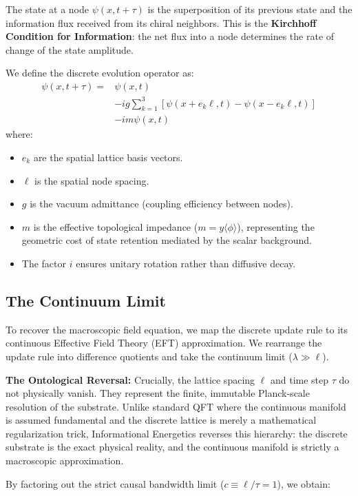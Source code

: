 The state at a node $\psi(x, t+\tau)$ is the superposition of its previous state and the information flux received from its chiral neighbors. This is the \textbf{Kirchhoff Condition for Information}: the net flux into a node determines the rate of change of the state amplitude.

We define the discrete evolution operator as:
\begin{align}
    \psi(x, t + \tau) = &\psi(x, t) \nonumber \\
    &- ig \sum_{k=1}^3[\psi(x + e_k \ell, t) - \psi(x - e_k \ell, t)] \nonumber \\
    &- im\psi(x, t)
\label{eq:unitary_flux}
\end{align}
where:
\begin{itemize}
    \item $e_k$ are the spatial lattice basis vectors.
    \item $\ell$ is the spatial node spacing.
    \item $g$ is the vacuum admittance (coupling efficiency between nodes).
    \item $m$ is the effective topological impedance ($m = y\langle\phi\rangle$), representing the geometric cost of state retention mediated by the scalar background.
    \item The factor $i$ ensures unitary rotation rather than diffusive decay.
\end{itemize}

\subsection{The Continuum Limit}
To recover the macroscopic field equation, we map the discrete update rule to its continuous Effective Field Theory (EFT) approximation. We rearrange the update rule into difference quotients and take the continuum limit ($\lambda \gg \ell$). 

\textbf{The Ontological Reversal:} Crucially, the lattice spacing $\ell$ and time step $\tau$ do not physically vanish. They represent the finite, immutable Planck-scale resolution of the substrate. Unlike standard QFT where the continuous manifold is assumed fundamental and the discrete lattice is merely a mathematical regularization trick, Informational Energetics reverses this hierarchy: the discrete substrate is the exact physical reality, and the continuous manifold is strictly a macroscopic approximation. 

By factoring out the strict causal bandwidth limit ($c \equiv \ell/\tau = 1$), we obtain:

